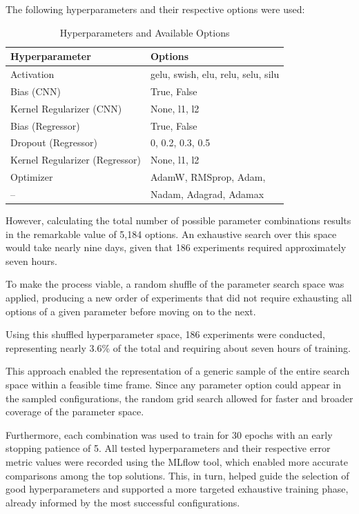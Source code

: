 \documentclass[sigconf,natbib=false]{acmart}
\begin{document}
The following hyperparameters and their respective options were used:

\begin{table} \small
  \caption{Hyperparameters and Available Options}
  \label{tab:hyperparams_options}
\begin{tabular}{ll}
    \toprule
    Hyperparameter & Options \\
    \midrule
    Activation & gelu, swish, elu, relu, selu, silu \\
    Bias (CNN) & True, False \\
    Kernel Regularizer (CNN) & None, l1, l2 \\
    Bias (Regressor) & True, False \\
    Dropout (Regressor) & 0, 0.2, 0.3, 0.5 \\
    Kernel Regularizer (Regressor) & None, l1, l2 \\
    Optimizer & AdamW, RMSprop, Adam, \\
    -- & Nadam, Adagrad, Adamax \\
    \bottomrule
  \end{tabular}
\end{table}

However, calculating the total number of possible parameter combinations results in the remarkable value of 5,184 options. An exhaustive search over this space would take nearly nine days, given that 186 experiments required approximately seven hours.

To make the process viable, a random shuffle of the parameter search space was applied, producing a new order of experiments that did not require exhausting all options of a given parameter before moving on to the next.

Using this shuffled hyperparameter space, 186 experiments were conducted, representing nearly 3.6\% of the total and requiring about seven hours of training.

This approach enabled the representation of a generic sample of the entire search space within a feasible time frame. Since any parameter option could appear in the sampled configurations, the random grid search allowed for faster and broader coverage of the parameter space.

Furthermore, each combination was used to train for 30 epochs with an early stopping patience of 5. All tested hyperparameters and their respective error metric values were recorded using the MLflow tool, which enabled more accurate comparisons among the top solutions. This, in turn, helped guide the selection of good hyperparameters and supported a more targeted exhaustive training phase, already informed by the most successful configurations.
\end{document}

